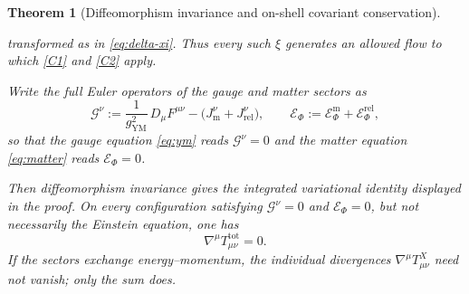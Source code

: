 \documentclass[11pt,a4paper]{article}
\theoremstyle{plain}
\newtheorem{theorem}{Theorem}[section]
\theoremstyle{definition}
\theoremstyle{remark}
\begin{document}
\begin{theorem}[Diffeomorphism invariance and on-shell covariant conservation]
\begin{enumerate}[label=(C\arabic*),leftmargin=2.8em]
      transformed as in \eqref{eq:delta-xi}. Thus every such $\xi$ generates an allowed flow to which
      \ref{C1} and \ref{C2} apply.
\end{enumerate}
Write the full Euler operators of the gauge and matter sectors as
\begin{equation}
\label{eq:euler-ops}
\mathcal{G}^{\nu}
:=\frac{1}{g_{\mathrm{YM}}^{2}}\,D_\mu F^{\mu\nu}
-\bigl(J^{\nu}_{\mathrm{m}}+J^{\nu}_{\mathrm{rel}}\bigr),
\qquad
\mathcal{E}_\Phi
:=\mathcal{E}^{\mathrm{m}}_{\Phi}+\mathcal{E}^{\mathrm{rel}}_{\Phi},
\end{equation}
so that the gauge equation \eqref{eq:ym} reads $\mathcal{G}^{\nu}=0$ and the matter equation
\eqref{eq:matter} reads $\mathcal{E}_\Phi=0$.

Then diffeomorphism invariance gives the integrated variational identity displayed in the proof. On
every configuration satisfying $\mathcal{G}^{\nu}=0$ and $\mathcal{E}_\Phi=0$, but not necessarily
the Einstein equation, one has
\begin{equation}
\label{eq:cons-b}
\nabla^{\mu}T^{\mathrm{tot}}_{\mu\nu}=0 .
\end{equation}
If the sectors exchange energy--momentum, the individual divergences $\nabla^\mu T^{X}_{\mu\nu}$
need not vanish; only the sum does.
\end{theorem}
\end{document}
